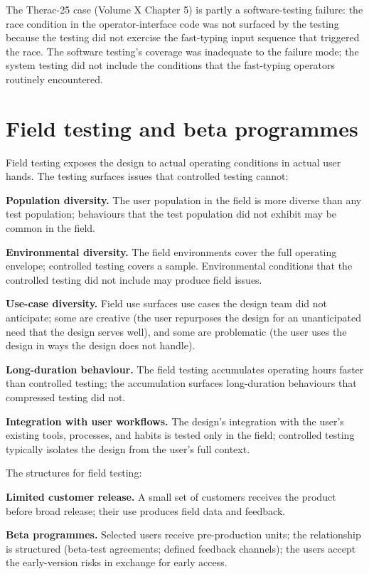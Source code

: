 The Therac-25 case (Volume X Chapter 5) is partly a software-testing failure: the race condition in the operator-interface code was not surfaced by the testing because the testing did not exercise the fast-typing input sequence that triggered the race. The software testing's coverage was inadequate to the failure mode; the system testing did not include the conditions that the fast-typing operators routinely encountered.

\section{Field testing and beta programmes}

Field testing exposes the design to actual operating conditions in actual user hands. The testing surfaces issues that controlled testing cannot:

\textbf{Population diversity.} The user population in the field is more diverse than any test population; behaviours that the test population did not exhibit may be common in the field.

\textbf{Environmental diversity.} The field environments cover the full operating envelope; controlled testing covers a sample. Environmental conditions that the controlled testing did not include may produce field issues.

\textbf{Use-case diversity.} Field use surfaces use cases the design team did not anticipate; some are creative (the user repurposes the design for an unanticipated need that the design serves well), and some are problematic (the user uses the design in ways the design does not handle).

\textbf{Long-duration behaviour.} The field testing accumulates operating hours faster than controlled testing; the accumulation surfaces long-duration behaviours that compressed testing did not.

\textbf{Integration with user workflows.} The design's integration with the user's existing tools, processes, and habits is tested only in the field; controlled testing typically isolates the design from the user's full context.

The structures for field testing:

\textbf{Limited customer release.} A small set of customers receives the product before broad release; their use produces field data and feedback.

\textbf{Beta programmes.} Selected users receive pre-production units; the relationship is structured (beta-test agreements; defined feedback channels); the users accept the early-version risks in exchange for early access.

